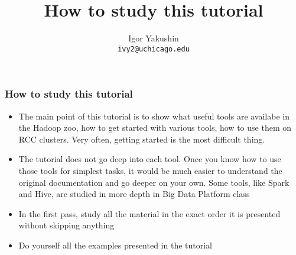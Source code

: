 \documentclass{beamer}
\title{\huge{How to study this tutorial}}
\author{Igor Yakushin \\ \texttt{ivy2@uchicago.edu}}
\date{}
\newcommand{\RCCLogo}{
\begin{textblock}{14}(1.5,1.5)
  \pgfuseimage{logo_rcc}
\end{textblock}
}
\begin{document}



\begin{frame}
\titlepage
\end{frame}

\begin{frame}[fragile]
  \frametitle{How to study this tutorial}
  \begin{itemize}
  \item The main point of this tutorial is to show what useful tools are availabe in the Hadoop zoo,
    how to get started with various tools, how to use them on RCC
    clusters. Very often, getting started is the most difficult thing.
    
  \item The tutorial does not go deep into each tool. Once you know how to use those tools for simplest tasks, it would be much easier
    to understand the original documentation and go deeper on your own. Some tools, like Spark and Hive, are studied in more depth in Big
    Data Platform class

  \item In the first pass, study all the material in the exact order it is presented without skipping anything
  \item Do yourself all the examples presented in the tutorial
  \end{itemize}
\end{frame}
\end{document}
